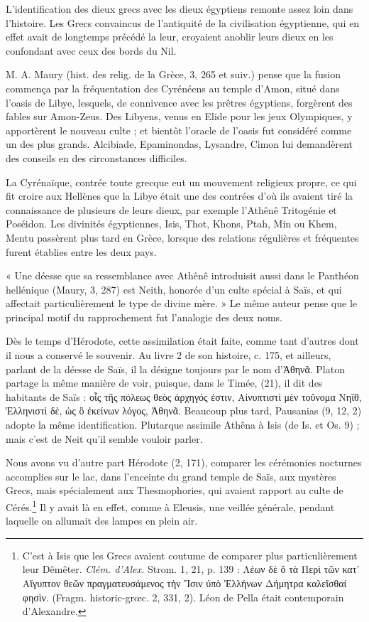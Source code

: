 \documentclass[a4paper, 11pt, oneside]{article}
\begin{document}
L'identification des dieux grecs avec les dieux égyptiens remonte assez loin dans l'histoire. Les Grecs convaincus de l'antiquité de la civilisation égyptienne, qui en effet avait de longtemps précédé la leur, croyaient anoblir leurs dieux en les confondant avec ceux des bords du Nil.

M. A. Maury (hist. des relig. de la Grèce, 3, 265 et suiv.) pense que la fusion commença par la fréquentation des Cyrénéens au temple d'Amon, situé dans l'oasis de Libye, lesquels, de connivence avec les prêtres égyptiens, forgèrent des fables sur Amon-Zeus. Des Libyens, venus en Elide pour les jeux Olympiques, y apportèrent le nouveau culte ; et bientôt l'oracle de l'oasis fut considéré comme un des plus grands. Alcibiade, Epaminondas, Lysandre, Cimon lui demandèrent des conseils en des circonstances difficiles.

La Cyrénaïque, contrée toute grecque eut un mouvement religieux propre, ce qui fit croire aux Hellènes que la Libye était une des contrées d'où ils avaient tiré la connaissance de plusieurs de leurs dieux, par exemple l'Athênê Tritogénie et Poséidon. Les divinités égyptiennes, Isis, Thot, Khons, Ptah, Min ou Khem, Mentu passèrent plus tard en Grèce, lorsque des relations régulières et fréquentes furent établies entre les deux pays.

« Une déesse que sa ressemblance avec Athênê introduisit aussi dans le Panthéon hellénique (Maury, 3, 287) est Neith, honorée d'un culte spécial à Saïs, et qui affectait particulièrement le type de divine mère. » Le même auteur pense que le principal motif du rapprochement fut l'analogie des deux noms.

Dès le temps d'Hérodote, cette assimilation était faite, comme tant d'autres dont il nous a conservé le souvenir. Au livre 2 de son histoire, c. 175, et ailleurs, parlant de la déesse de Saïs, il la désigne toujours par le nom d'Ἀθηνᾶ. Platon partage la même manière de voir, puisque, dans le Timée, (21), il dit des habitants de Saïs : οἷς τῆς πόλεως θεὸς ἀρχηγός ἐστιν, Αἰνυπτιστὶ μὲν τοὔνομα Νηΐθ, Ἑλληνιστὶ δὲ, ὡς ὃ ἐκείνων λόγος, Ἀθηνᾶ. Beaucoup plus tard, Pausanias (9, 12, 2) adopte la même identification. Plutarque assimile Athêna à Isis (de Is. et Os. 9) ; mais c'est de Neit qu'il semble vouloir parler.

Nous avons vu d'autre part Hérodote (2, 171), comparer les cérémonies nocturnes accomplies sur le lac, dans l'enceinte du grand temple de Saïs, aux mystères Grecs, mais spécialement aux Thesmophories, qui avaient rapport au culte de Cérés.\footnote{C'est à Isis que les Grecs avaient coutume de comparer plus particulièrement leur Dêmêter. \emph{Clém. d'Alex.} Strom. 1, 21, p. 139 : Λέων δὲ ὃ τὰ Περὶ τῶν κατ᾽ Αἴγυπτον θεῶν πραγματευσάμενος τὴν Ἴσιν ὑπὸ Ἑλλήνων Δήμητρα καλεῖσθαί φησὶν. (Fragm. historic-grœc. 2, 331, 2). Léon de Pella était contemporain d'Alexandre.} Il y avait là en effet, comme à Eleusis, une veillée générale, pendant laquelle on allumait des lampes en plein air.
\end{document}
